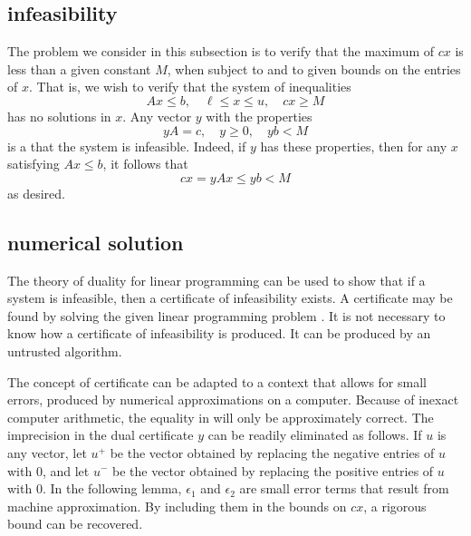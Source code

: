 \subsection{infeasibility}

The problem we consider in this subsection is to verify that the
maximum of $c x$ is less than a given constant $M$, when subject to
 and to given bounds on the entries of $x$.
That is, we wish to verify that the system of inequalities
\begin{equation}\label{eqn:empty}
A x \le b,\quad \ell \le x\le u,\quad c x \ge M
\end{equation}
has no solutions in $x$. Any vector $y$ with the properties
\begin{equation}\label{eqn:y}
  y A = c,\quad y\ge 0,\quad y b < M
\end{equation}
is a  that the system  is infeasible.  Indeed,
if $y$ has these properties, then for any $x$ satisfying
$A x \le b$, it follows that
\begin{equation}\label{eqn:cxM}
  c x = y A x \le y b < M
\end{equation}
as desired.


\subsection{numerical solution}


The theory of duality for linear programming can be used to show that if a
system is infeasible, then a certificate of infeasibility exists.  A certificate
may be found by solving the given linear programming problem .
It is not necessary to know how a
certificate of infeasibility is produced.  It can be produced 
by an untrusted algorithm.  

The concept of certificate can be
adapted to a context that allows for small  errors, produced by
numerical approximations on a computer.
Because of inexact computer arithmetic, the
equality in  will only be approximately correct. The imprecision in the
dual certificate $y$ can be readily eliminated as follows. If $u$ is any
vector, let $u^+$ be the vector obtained by replacing the negative
entries of $u$ with $0$, and let $u^-$ be the vector obtained by
replacing the positive entries of $u$ with $0$.  In the
following lemma, $\epsilon_1$ and $\epsilon_2$ are small error terms
that result from machine approximation. By including them in the
bounds on $c x$, a rigorous bound can be recovered.  


